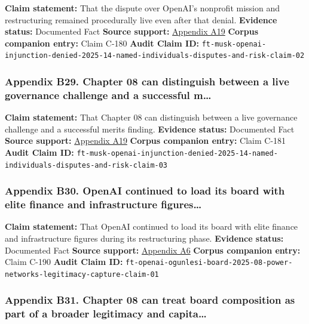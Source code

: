 \documentclass[
  american,
  11pt,
  letterpaper,
]{article}
\begin{document}
\textbf{Claim statement:} That the dispute over OpenAI's nonprofit
mission and restructuring remained procedurally live even after that
denial. \textbf{Evidence status:} Documented Fact \textbf{Source
support:}
\hyperref[ch-08-appendix-a19-judge-denies-elon-musks-attempt-to-immediately-block-openais-conversion-to-for-profit-entity]{Appendix
A19} \textbf{Corpus companion entry:} Claim C-180 \textbf{Audit Claim
ID:}
\texttt{ft-musk-openai-injunction-denied-2025-14-named-individuals-disputes-and-risk-claim-02}

\subsubsection{Appendix B29. Chapter 08 can distinguish between a live
governance challenge and a successful
m\ldots{}}\label{ch-08-appendix-b29-chapter-08-can-distinguish-between-a-live-governance-challenge-and-a-successful-m}

\textbf{Claim statement:} That Chapter 08 can distinguish between a live
governance challenge and a successful merits finding. \textbf{Evidence
status:} Documented Fact \textbf{Source support:}
\hyperref[ch-08-appendix-a19-judge-denies-elon-musks-attempt-to-immediately-block-openais-conversion-to-for-profit-entity]{Appendix
A19} \textbf{Corpus companion entry:} Claim C-181 \textbf{Audit Claim
ID:}
\texttt{ft-musk-openai-injunction-denied-2025-14-named-individuals-disputes-and-risk-claim-03}

\subsubsection{Appendix B30. OpenAI continued to load its board with
elite finance and infrastructure
figures\ldots{}}\label{ch-08-appendix-b30-openai-continued-to-load-its-board-with-elite-finance-and-infrastructure-figures}

\textbf{Claim statement:} That OpenAI continued to load its board with
elite finance and infrastructure figures during its restructuring phase.
\textbf{Evidence status:} Documented Fact \textbf{Source support:}
\hyperref[ch-08-appendix-a6-openai-appoints-one-of-wall-street-s-most-powerful-dealmakers-to-its-board]{Appendix
A6} \textbf{Corpus companion entry:} Claim C-190 \textbf{Audit Claim
ID:}
\texttt{ft-openai-ogunlesi-board-2025-08-power-networks-legitimacy-capture-claim-01}

\subsubsection{Appendix B31. Chapter 08 can treat board composition as
part of a broader legitimacy and
capita\ldots{}}\label{ch-08-appendix-b31-chapter-08-can-treat-board-composition-as-part-of-a-broader-legitimacy-and-capita}
\end{document}
